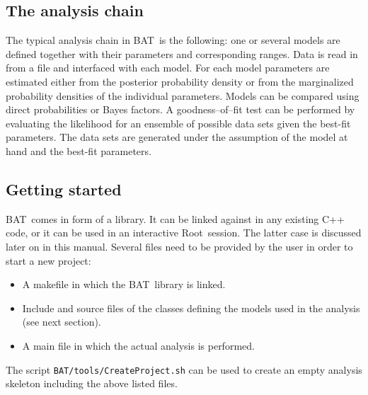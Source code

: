 \documentclass[11pt, a4paper]{article}
\newcommand{\bat}{{\sc BAT}}
\newcommand{\Root}{{\sc Root}}
\begin{document}
\subsection{The analysis chain}
\label{subsection:chain}

The typical analysis chain in \bat\ is the following: one or several
models are defined together with their parameters and corresponding
ranges. Data is read in from a file and interfaced with each
model. For each model parameters are estimated either from the
posterior probability density or from the marginalized probability
densities of the individual parameters. Models can be compared using
direct probabilities or Bayes factors. A goodness--of--fit test can be
performed by evaluating the likelihood for an ensemble of possible
data sets given the best-fit parameters. The data sets are generated
under the assumption of the model at hand and the best-fit
parameters. \\


\subsection{Getting started}
\label{subsection:start}

\bat\ comes in form of a library. It can be linked against in any
existing C++ code, or it can be used in an interactive
\Root\ session. The latter case is discussed later on in this
manual. Several files need to be provided by the user in order to
start a new project:
%
\begin{itemize}
\item A makefile in which the \bat\ library is linked.
\item Include and source files of the classes defining the models
used in the analysis (see next section).
\item A main file in which the actual analysis is performed.
\end{itemize}
%
The script \verb|BAT/tools/CreateProject.sh| can be used to create an
empty analysis skeleton including the above listed files.

\end{document}
